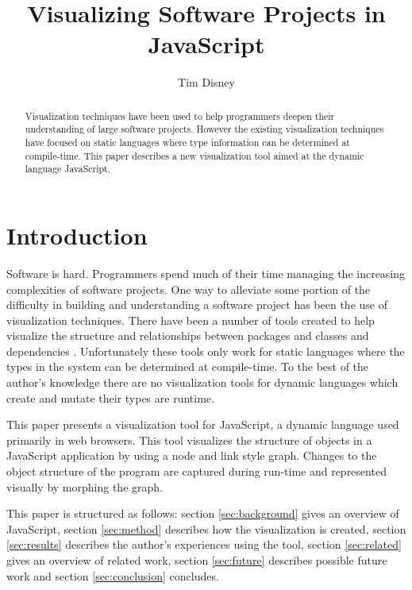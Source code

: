 \documentclass[]{article}
\begin{document}
\title{Visualizing Software Projects in JavaScript}
\author{Tim Disney}
\date{}

\maketitle

\lstset{showstringspaces=false}

\begin{abstract}
  Visualization techniques have been used to help programmers deepen their understanding of large software projects. However the existing visualization techniques have focused on static languages where type information can be determined at compile-time. This paper describes a new visualization tool aimed at the dynamic language JavaScript.
\end{abstract}

\section{Introduction}
\label{sec:introduction}
Software is hard. Programmers spend much of their time managing the increasing complexities of software projects. One way to alleviate some portion of the difficulty in building and understanding a software project has been the use of visualization techniques. There have been a number of tools created to help visualize the structure and relationships between packages and classes \cite{solidsx, haskellvis} and dependencies \cite{idea, stan4j}. Unfortunately these tools only work for static languages where the types in the system can be determined at compile-time. To the best of the author's knowledge there are no visualization tools for dynamic languages which create and mutate their types are runtime.

This paper presents a visualization tool for JavaScript, a dynamic language used primarily in web browsers. This tool visualizes the structure of objects in a JavaScript application by using a node and link style graph. Changes to the object structure of the program are captured during run-time and represented visually by morphing the graph.

This paper is structured as follows: section \ref{sec:background} gives an overview of JavaScript, section \ref{sec:method} describes how the visualization is created, section \ref{sec:results} describes the author's experiences using the tool, section \ref{sec:related} gives an overview of related work, section \ref{sec:future} describes possible future work and section \ref{sec:conclusion} concludes.
\end{document}
